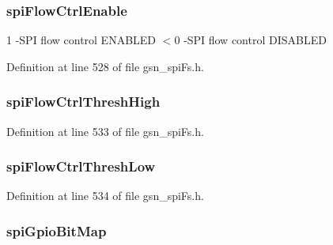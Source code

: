 \hypertarget{a00232_a1bc4a98bab8dbbd5b534535948c82885}{
\subsubsection[{spiFlowCtrlEnable}]{ {\bf spiFlowCtrlEnable}}}
\label{a00232_a1bc4a98bab8dbbd5b534535948c82885}
1 -\/SPI flow control ENABLED $<$0 -\/SPI flow control DISABLED 

Definition at line 528 of file gsn\_\-spiFs.h.

\hypertarget{a00232_a7a439375ec71a8ebe796fcf8730e7b25}{
\subsubsection[{spiFlowCtrlThreshHigh}]{ {\bf spiFlowCtrlThreshHigh}}}
\label{a00232_a7a439375ec71a8ebe796fcf8730e7b25}


Definition at line 533 of file gsn\_\-spiFs.h.

\hypertarget{a00232_ab3786a410bf7727e7b2a8fc665b8166e}{
\subsubsection[{spiFlowCtrlThreshLow}]{ {\bf spiFlowCtrlThreshLow}}}
\label{a00232_ab3786a410bf7727e7b2a8fc665b8166e}


Definition at line 534 of file gsn\_\-spiFs.h.

\hypertarget{a00232_a0b3967ea299cf8eb236778533abc97be}{
\subsubsection[{spiGpioBitMap}]{ {\bf spiGpioBitMap}}}
\label{a00232_a0b3967ea299cf8eb236778533abc97be}


